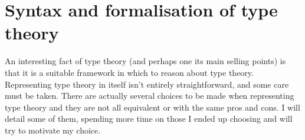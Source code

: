 \chapter{Syntax and formalisation of type theory}

An interesting fact of type theory (and perhaps one its main selling points) is
that it is a suitable framework in which to reason about type theory.
Representing type theory in itself isn't entirely straightforward, and some care
must be taken. There are actually several choices to be made when representing
type theory and they are not all equivalent or with the same pros and cons.
I will detail some of them, spending more time on those I ended up choosing
and will try to motivate my choice.